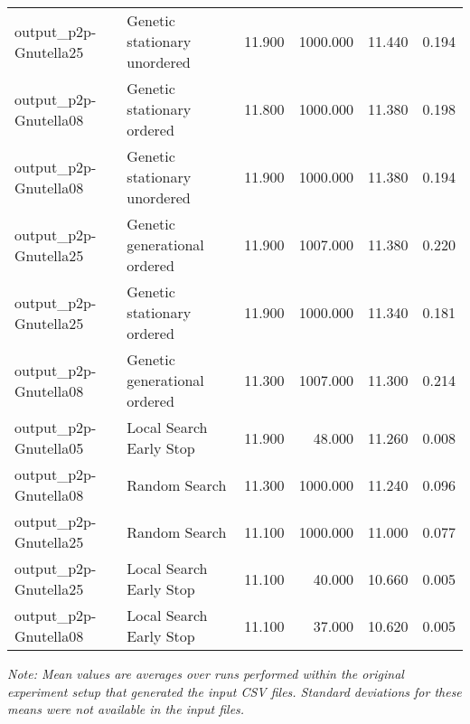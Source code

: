 \documentclass{article}
\begin{document}
\begin{table}[htbp]
{\begin{tabular}{ l l r r r r }
    output\_p2p-Gnutella25 & Genetic stationary unordered & 11.900 & 1000.000 & 11.440 & 0.194 \\
    output\_p2p-Gnutella08 & Genetic stationary ordered & 11.800 & 1000.000 & 11.380 & 0.198 \\
    output\_p2p-Gnutella08 & Genetic stationary unordered & 11.900 & 1000.000 & 11.380 & 0.194 \\
    output\_p2p-Gnutella25 & Genetic generational ordered & 11.900 & 1007.000 & 11.380 & 0.220 \\
    output\_p2p-Gnutella25 & Genetic stationary ordered & 11.900 & 1000.000 & 11.340 & 0.181 \\
    output\_p2p-Gnutella08 & Genetic generational ordered & 11.300 & 1007.000 & 11.300 & 0.214 \\
    output\_p2p-Gnutella05 & Local Search Early Stop & 11.900 & 48.000 & 11.260 & 0.008 \\
    output\_p2p-Gnutella08 & Random Search & 11.300 & 1000.000 & 11.240 & 0.096 \\
    output\_p2p-Gnutella25 & Random Search & 11.100 & 1000.000 & 11.000 & 0.077 \\
    output\_p2p-Gnutella25 & Local Search Early Stop & 11.100 & 40.000 & 10.660 & 0.005 \\
    output\_p2p-Gnutella08 & Local Search Early Stop & 11.100 & 37.000 & 10.620 & 0.005 \\
    \bottomrule
  \end{tabular}%
  } %
\end{table}

\vspace{1em}

\bigskip
\textit{Note: Mean values are averages over runs performed within the original experiment setup that generated the input CSV files. Standard deviations for these means were not available in the input files.}
\end{document}
